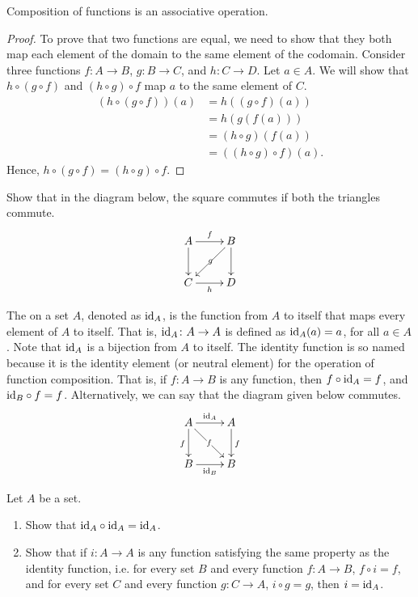 \begin{Theorem}\label{thm:FuncCompAssoc}
Composition of functions is an associative operation.
\end{Theorem}

\begin{proof}
To prove that two functions are equal, we need to show that they both map each element of the domain to the same element of the codomain. Consider three functions $f \colon A \to B$, $g \colon B \to C$, and $h \colon C \to D$. Let $a \in A$. We will show that $h \circ (g \circ f)$ and $(h \circ g) \circ f$ map $a$ to the same element of $C$.
\begin{align*}
(h \circ (g \circ f))(a) & = h((g \circ f)(a)) \\
    & = h(g(f(a))) \\
    & = (h \circ g)(f(a)) \\
    & = ((h \circ g) \circ f)(a).
\end{align*}
Hence, $h \circ (g \circ f) = (h \circ g) \circ f$.
\end{proof}

\begin{Exercise}
Show that in the diagram below, the square commutes if both the triangles commute.
\begin{equation*}
\xymatrix{
A \ar[r]^f \ar[d] & B \ar[dl]|-g \ar[d]\\
C \ar[r]_h & D
}
\end{equation*}
\end{Exercise}

The  on a set $A$, denoted as $\mathrm{id}_A$, is the function from $A$ to itself that maps every element of $A$ to itself. That is, $\mathrm{id}_A \colon A \to A$ is defined as $\mathrm{id}_A(a) = a$, for all $a \in A$. Note that $\mathrm{id}_A$ is a bijection from $A$ to itself. The identity function is so named because it is the identity element (or neutral element) for the operation of function composition. That is, if $f \colon A \to B$ is any function, then $f \circ \mathrm{id}_A = f$, and $\mathrm{id}_B \circ f = f$. Alternatively, we can say that the diagram given below commutes.
\begin{equation*}
\xymatrix{
A \ar[d]_{f} \ar[r]^{\id_A} \ar[dr]|-f & A \ar[d]^{f}\\
B \ar[r]_{\id_B} & B
}
\end{equation*}

\begin{Exercise}
Let $A$ be a set.
\begin{enumerate}
\item Show that $\mathrm{id}_A \circ \mathrm{id}_A = \mathrm{id}_A$.
\item Show that if $i \colon A \to A$ is any function satisfying the same property as the identity function, i.e. for every set $B$ and every function $f \colon A \to B$, $f \circ i = f$, and for every set $C$ and every function $g \colon C \to A$, $i \circ g = g$,  then $i = \mathrm{id}_A$.
\end{enumerate}
\end{Exercise}

